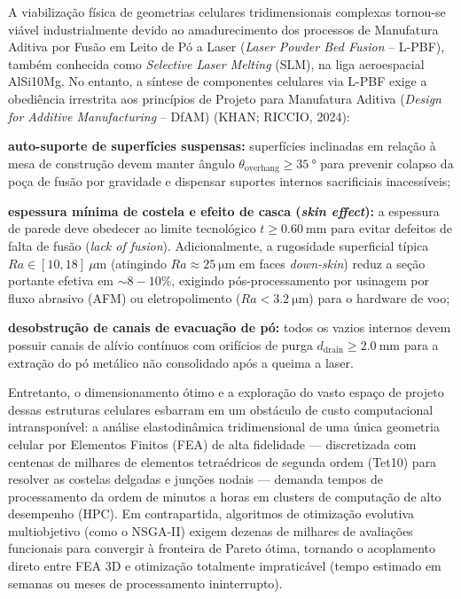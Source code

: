 A viabilização física de geometrias celulares tridimensionais complexas tornou-se viável industrialmente devido ao amadurecimento dos processos de Manufatura Aditiva por Fusão em Leito de Pó a Laser (\textit{Laser Powder Bed Fusion} -- L-PBF), também conhecida como \textit{Selective Laser Melting} (SLM), na liga aeroespacial AlSi10Mg. No entanto, a síntese de componentes celulares via L-PBF exige a obediência irrestrita aos princípios de Projeto para Manufatura Aditiva (\textit{Design for Additive Manufacturing} -- DfAM) (KHAN; RICCIO, 2024):
\begin{alineas}
  \item \textbf{auto-suporte de superfícies suspensas:} superfícies inclinadas em relação à mesa de construção devem manter ângulo $\theta_{\text{overhang}} \ge \SI{35}{\degree}$ para prevenir colapso da poça de fusão por gravidade e dispensar suportes internos sacrificiais inacessíveis;
  \item \textbf{espessura mínima de costela e efeito de casca (\textit{skin effect}):} a espessura de parede deve obedecer ao limite tecnológico $t \ge \SI{0.60}{\milli\metre}$ para evitar defeitos de falta de fusão (\textit{lack of fusion}). Adicionalmente, a rugosidade superficial típica $Ra \in [10, 18]\ \mu\text{m}$ (atingindo $Ra \approx \SI{25}{\micro\metre}$ em faces \textit{down-skin}) reduz a seção portante efetiva em $\sim 8 - 10\%$, exigindo pós-processamento por usinagem por fluxo abrasivo (AFM) ou eletropolimento ($Ra < \SI{3.2}{\micro\metre}$) para o hardware de voo;
  \item \textbf{desobstrução de canais de evacuação de pó:} todos os vazios internos devem possuir canais de alívio contínuos com orifícios de purga $d_{\text{drain}} \ge \SI{2.0}{\milli\metre}$ para a extração do pó metálico não consolidado após a queima a laser.
\end{alineas}

Entretanto, o dimensionamento ótimo e a exploração do vasto espaço de projeto dessas estruturas celulares esbarram em um obstáculo de custo computacional intransponível: a análise elastodinâmica tridimensional de uma única geometria celular por Elementos Finitos (FEA) de alta fidelidade — discretizada com centenas de milhares de elementos tetraédricos de segunda ordem (Tet10) para resolver as costelas delgadas e junções nodais — demanda tempos de processamento da ordem de minutos a horas em clusters de computação de alto desempenho (HPC). Em contrapartida, algoritmos de otimização evolutiva multiobjetivo (como o NSGA-II) exigem dezenas de milhares de avaliações funcionais para convergir à fronteira de Pareto ótima, tornando o acoplamento direto entre FEA 3D e otimização totalmente impraticável (tempo estimado em semanas ou meses de processamento ininterrupto).

